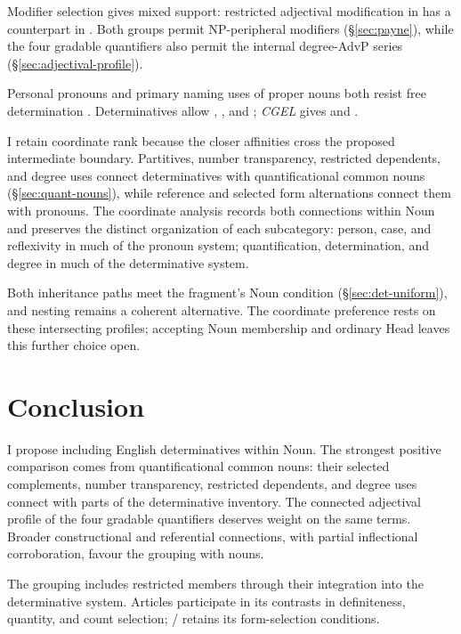 \documentclass[12pt]{article}
\begin{document}
Modifier selection gives mixed support: restricted adjectival modification in  \citep[429--430]{huddleston2002} has a counterpart in . Both groups permit NP-peripheral modifiers (§\ref{sec:payne}), while the four gradable quantifiers also permit the internal degree-AdvP series (§\ref{sec:adjectival-profile}).

Personal pronouns and primary naming uses of proper nouns both resist free determination \citep[429--430, 517, 519--520]{huddleston2002}. Determinatives allow , , and ; \textit{CGEL} gives  and  \citep[415--416]{huddleston2002}.

I retain coordinate rank because the closer affinities cross the proposed intermediate boundary. Partitives, number transparency, restricted dependents, and degree uses connect determinatives with quantificational common nouns (§\ref{sec:quant-nouns}), while reference and selected form alternations connect them with pronouns. The coordinate analysis records both connections within Noun and preserves the distinct organization of each subcategory: person, case, and reflexivity in much of the pronoun system; quantification, determination, and degree in much of the determinative system.

Both inheritance paths meet the fragment's Noun condition (§\ref{sec:det-uniform}), and nesting remains a coherent alternative. The coordinate preference rests on these intersecting profiles; accepting Noun membership and ordinary Head leaves this further choice open.

\section{Conclusion}\label{sec:conclusion}

I propose including English determinatives within Noun. The strongest positive comparison comes from quantificational common nouns: their selected complements, number transparency, restricted dependents, and degree uses connect with parts of the determinative inventory. The connected adjectival profile of the four gradable quantifiers deserves weight on the same terms. Broader constructional and referential connections, with partial inflectional corroboration, favour the grouping with nouns.

The grouping includes restricted members through their integration into the determinative system. Articles participate in its contrasts in definiteness, quantity, and count selection; / retains its form-selection conditions.
\end{document}
